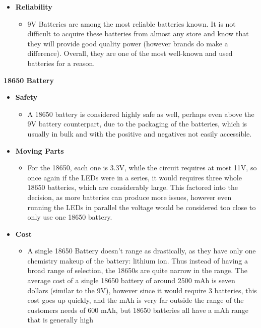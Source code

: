 \documentclass[12pt]{article}
\begin{document}
{\begin{itemize}
\begin{itemize}
							\end{itemize}
							\item \textbf{Reliability}
							\begin{itemize}
								\item 9V Batteries are among the most reliable batteries known. It is not difficult to acquire these batteries from almost any store and know that they will provide good quality power (however brands do make a difference). Overall, they are one of the most well-known and used batteries for a reason.
							\end{itemize}
						\end{itemize}
					}
					
					\noindent\textbf{18650 Battery}
					{\renewcommand\labelitemi{}
						\begin{itemize}
							\item \textbf{Safety}
							\begin{itemize}
								\item A 18650 battery is considered highly safe as well, perhaps even above the 9V battery counterpart, due to the packaging of the batteries, which is usually in bulk and with the positive and negatives not easily accessible. 
							\end{itemize}
							\item \textbf{Moving Parts}
							\begin{itemize}
								\item For the 18650, each one is 3.3V, while the circuit requires at most 11V, so once again if the LEDs were in a series, it would requires three whole 18650 batteries, which are considerably large. This factored into the decision, as more batteries can produce more issues, however even running the LEDs in parallel the voltage would be considered too close to only use one 18650 battery.
							\end{itemize}
							\item \textbf{Cost}
							\begin{itemize}
								\item A single 18650 Battery doesn't range as drastically, as they have only one chemistry makeup of the battery: lithium ion. Thus instead of having a broad range of selection, the 18650s are quite narrow in the range. The average cost of a single 18650 battery of around 2500 mAh is seven dollars (similar to the 9V), however since it would require 3 batteries, this cost goes up quickly, and the mAh is very far outside the range of the customers needs of 600 mAh, but 18650 batteries all have a mAh range that is generally high

\end{itemize}
\end{itemize}}
\end{document}

